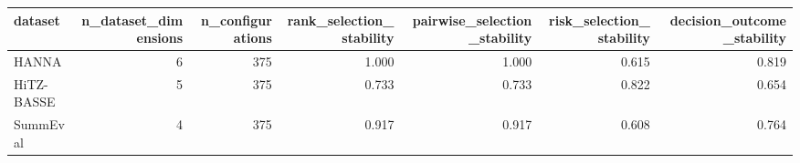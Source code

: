\begin{tabular}{lrrrrrr}
\toprule
dataset & n\_dataset\_dimensions & n\_configurations & rank\_selection\_stability & pairwise\_selection\_stability & risk\_selection\_stability & decision\_outcome\_stability \\
\midrule
HANNA & 6 & 375 & 1.000 & 1.000 & 0.615 & 0.819 \\
HiTZ-BASSE & 5 & 375 & 0.733 & 0.733 & 0.822 & 0.654 \\
SummEval & 4 & 375 & 0.917 & 0.917 & 0.608 & 0.764 \\
\bottomrule
\end{tabular}
